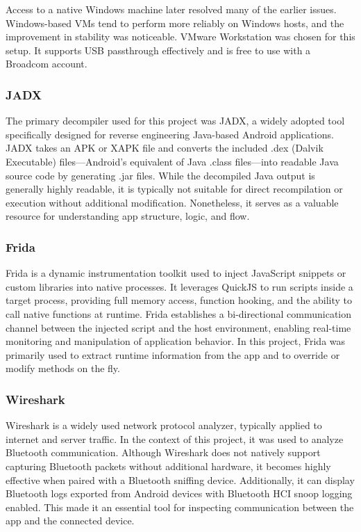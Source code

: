 Access to a native Windows machine later resolved many of the earlier issues. Windows-based VMs tend to perform more reliably on Windows hosts, and the improvement in stability was noticeable. VMware Workstation was chosen for this setup. It supports USB passthrough effectively and is free to use with a Broadcom account.


\subsubsection{JADX}
The primary decompiler used for this project was JADX, a widely adopted tool specifically designed for reverse engineering Java-based Android applications. JADX takes an APK or XAPK file and converts the included .dex (Dalvik Executable) files—Android’s equivalent of Java .class files—into readable Java source code by generating .jar files. While the decompiled Java output is generally highly readable, it is typically not suitable for direct recompilation or execution without additional modification. Nonetheless, it serves as a valuable resource for understanding app structure, logic, and flow.

\subsubsection{Frida}
Frida is a dynamic instrumentation toolkit used to inject JavaScript snippets or custom libraries into native processes. It leverages QuickJS to run scripts inside a target process, providing full memory access, function hooking, and the ability to call native functions at runtime. Frida establishes a bi-directional communication channel between the injected script and the host environment, enabling real-time monitoring and manipulation of application behavior. In this project, Frida was primarily used to extract runtime information from the app and to override or modify methods on the fly.

\subsubsection{Wireshark}
Wireshark is a widely used network protocol analyzer, typically applied to internet and server traffic. In the context of this project, it was used to analyze Bluetooth communication. Although Wireshark does not natively support capturing Bluetooth packets without additional hardware, it becomes highly effective when paired with a Bluetooth sniffing device. Additionally, it can display Bluetooth logs exported from Android devices with Bluetooth HCI snoop logging enabled. This made it an essential tool for inspecting communication between the app and the connected device.

